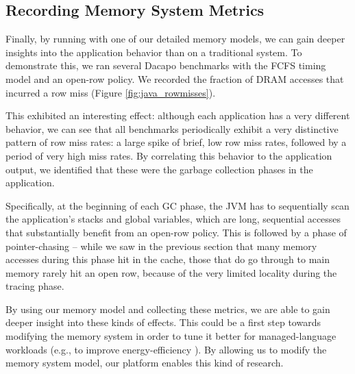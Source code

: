 \subsection{Recording Memory System Metrics}

Finally, by running with one of our detailed memory models, we can gain deeper insights into the application behavior than on a traditional system. To demonstrate this, we ran several Dacapo benchmarks with the FCFS timing model and an open-row policy. We recorded the fraction of DRAM accesses that incurred a row miss (Figure \ref{fig:java_rowmisses}).

This exhibited an interesting effect: although each application has a very different behavior, we can see that all benchmarks periodically exhibit a very distinctive pattern of row miss rates: a large spike of brief, low row miss rates, followed by a period of very high miss rates. By correlating this behavior to the application output, we identified that these were the garbage collection phases in the application.

Specifically, at the beginning of each GC phase, the JVM has to sequentially scan the application's stacks and global variables, which are long, sequential accesses that substantially benefit from an open-row policy. This is followed by a phase of pointer-chasing -- while we saw in the previous section that many memory accesses during this phase hit in the cache, those that do go through to main memory rarely hit an open row, because of the very limited locality during the tracing phase.

By using our memory model and collecting these metrics, we are able to gain deeper insight into these kinds of effects. This could be a first step towards modifying the memory system in order to tune it better for managed-language workloads (e.g., to improve energy-efficiency \cite{Cao:2012:YYP:2337159.2337185}). By allowing us to modify the memory system model, our platform enables this kind of research.
